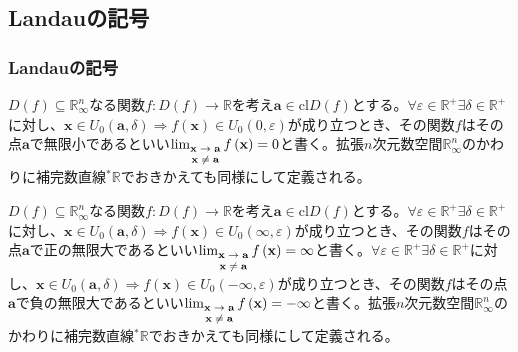\documentclass[dvipdfmx]{jsarticle}
\begin{document}
\subsection{Landauの記号}%
\subsubsection{Landauの記号}%
\begin{dfn}
$D(f) \subseteq \mathbb{R}_{\infty}^{n}$なる関数$f:D(f) \rightarrow \mathbb{R}$を考え$\mathbf{a} \in \mathrm{cl}{D(f)}$とする。$\forall\varepsilon \in \mathbb{R}^{+}\exists\delta \in \mathbb{R}^{+}$に対し、$\mathbf{x} \in U_{0}\left( \mathbf{a},\delta \right) \Rightarrow f\left( \mathbf{x} \right) \in U_{0}(0,\varepsilon)$が成り立つとき、その関数$f$はその点$\mathbf{a}$で無限小であるといい$\lim_{\scriptsize \begin{matrix}
\mathbf{x} \rightarrow \mathbf{a} \\
\mathbf{x} \neq \mathbf{a} \\
\end{matrix}}{f\left( \mathbf{x} \right)} = 0$と書く。拡張$n$次元数空間$\mathbb{R}_{\infty}^{n}$のかわりに補完数直線${}^{*}\mathbb{R}$でおきかえても同様にして定義される。
\end{dfn}
\begin{dfn}
$D(f) \subseteq \mathbb{R}_{\infty}^{n}$なる関数$f:D(f) \rightarrow \mathbb{R}$を考え$\mathbf{a} \in \mathrm{cl}{D(f)}$とする。$\forall\varepsilon \in \mathbb{R}^{+}\exists\delta \in \mathbb{R}^{+}$に対し、$\mathbf{x} \in U_{0}\left( \mathbf{a},\delta \right) \Rightarrow f\left( \mathbf{x} \right) \in U_{0}(\infty,\varepsilon)$が成り立つとき、その関数$f$はその点$\mathbf{a}$で正の無限大であるといい$\lim_{\scriptsize \begin{matrix}
\mathbf{x} \rightarrow \mathbf{a} \\
\mathbf{x} \neq \mathbf{a} \\
\end{matrix}}{f\left( \mathbf{x} \right)} = \infty$と書く。$\forall\varepsilon \in \mathbb{R}^{+}\exists\delta \in \mathbb{R}^{+}$に対し、$\mathbf{x} \in U_{0}\left( \mathbf{a},\delta \right) \Rightarrow f\left( \mathbf{x} \right) \in U_{0}( - \infty,\varepsilon)$が成り立つとき、その関数$f$はその点$\mathbf{a}$で負の無限大であるといい$\lim_{\scriptsize \begin{matrix}
\mathbf{x} \rightarrow \mathbf{a} \\
\mathbf{x} \neq \mathbf{a} \\
\end{matrix}}{f\left( \mathbf{x} \right)} = - \infty$と書く。拡張$n$次元数空間$\mathbb{R}_{\infty}^{n}$のかわりに補完数直線${}^{*}\mathbb{R}$でおきかえても同様にして定義される。
\end{dfn}
\end{document}
